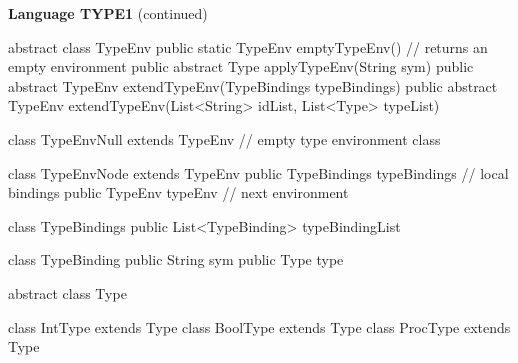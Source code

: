 \begin{minipage}[t]{\sw}
\slidenumber
\LARGE
{\bf Language TYPE1} (continued)\exx
\large
\begin{qv}
abstract class TypeEnv
    public static TypeEnv emptyTypeEnv() // returns an empty environment
    public abstract Type applyTypeEnv(String sym)
    public abstract TypeEnv extendTypeEnv(TypeBindings typeBindings)
    public abstract TypeEnv extendTypeEnv(List<String> idList, List<Type> typeList)

class TypeEnvNull extends TypeEnv  // empty type environment class

class TypeEnvNode extends TypeEnv
    public TypeBindings typeBindings // local bindings
    public TypeEnv typeEnv     // next environment

class TypeBindings
    public List<TypeBinding> typeBindingList

class TypeBinding
    public String sym
    public Type type

abstract class Type

class IntType extends Type
class BoolType extends Type
class ProcType extends Type
\end{qv}
\end{minipage}
